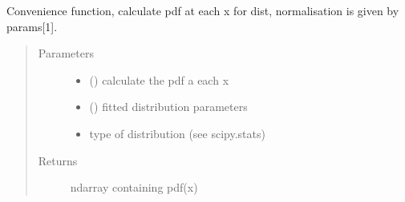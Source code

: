 \documentclass[letterpaper,10pt,english]{sphinxmanual}
\begin{document}
\begin{fulllineitems}
\label{\detokenize{tes:tes.analysis.scaled_pdf}}
\sphinxAtStartPar
Convenience function, calculate pdf at each x for dist, normalisation is
given by params{[}\sphinxhyphen{}1{]}.
\begin{quote}\begin{description}
\item[{Parameters}] \leavevmode\begin{itemize}
\item {} 
\sphinxAtStartPar
{} (\sphinxstyleliteralemphasis{\sphinxupquote{{[}}}\sphinxstyleliteralemphasis{\sphinxupquote{, }}\sphinxstyleliteralemphasis{\sphinxupquote{{]}}}) \textendash{} calculate the pdf a each x

\item {} 
\sphinxAtStartPar
{} () \textendash{} fitted distribution parameters

\item {} 
\sphinxAtStartPar
{} \textendash{} type of distribution (see scipy.stats)

\end{itemize}

\item[{Returns}] \leavevmode
\sphinxAtStartPar
ndarray containing pdf(x)

\end{description}\end{quote}

\end{fulllineitems}


\begin{fulllineitems}
\label{\detokenize{tes:tes.analysis.thermal_ml}}
\end{fulllineitems}
\end{document}
